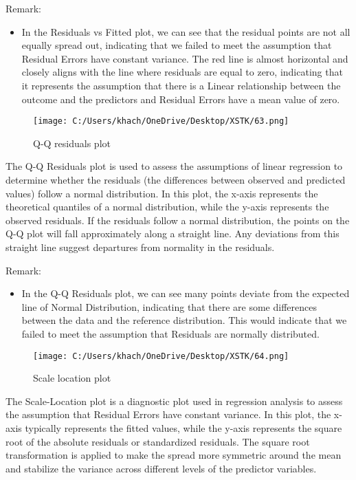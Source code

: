 \documentclass[a4paper]{article}
\begin{document}
	Remark: 
	\begin{itemize}
		\item In the Residuals vs Fitted plot, we can see that the residual points are not all equally spread out, indicating that we failed to meet the assumption that Residual Errors have constant variance. The red line is almost horizontal and closely aligns with the line where residuals are equal to zero, indicating that it represents the assumption that there is a Linear relationship between the outcome and the predictors and Residual Errors have a mean value of zero.
	\end{itemize}
	\begin{figure}[htbp]
		\centering
		\begin{adjustbox}{width=0.7\textwidth, frame}
			\texttt{[image: C:/Users/khach/OneDrive/Desktop/XSTK/63.png]}
		\end{adjustbox}
		\captionsetup{justification=centering}
		\vspace{0.5cm}
		\caption{Q-Q residuals plot}
	\end{figure}
	The Q-Q Residuals plot is used to assess the assumptions of linear regression to determine whether the residuals (the differences between observed and predicted values) follow a normal distribution. In this plot, the x-axis represents the theoretical quantiles of a normal distribution, while the y-axis represents the observed residuals. If the residuals follow a normal distribution, the points on the Q-Q plot will fall approximately along a straight line. Any deviations from this straight line suggest departures from normality in the residuals.
	
	Remark: 
	\begin{itemize}
		\item In the Q-Q Residuals plot, we can see many points deviate from the expected line of Normal Distribution, indicating that there are some differences between the data and the reference distribution. This would indicate that we failed to meet the assumption that Residuals are normally distributed.
	\end{itemize}
	\begin{figure}[htbp]
		\centering
		\begin{adjustbox}{width=0.7\textwidth, frame}
			\texttt{[image: C:/Users/khach/OneDrive/Desktop/XSTK/64.png]}
		\end{adjustbox}
		\captionsetup{justification=centering}
		\vspace{0.5cm}
		\caption{Scale location plot}
	\end{figure}
	The Scale-Location plot is a diagnostic plot used in regression analysis to assess the assumption that Residual Errors have constant variance. In this plot, the x-axis typically represents the fitted values, while the y-axis represents the square root of the absolute residuals or standardized residuals. The square root transformation is applied to make the spread more symmetric around the mean and stabilize the variance across different levels of the predictor variables.
	
\end{document}

